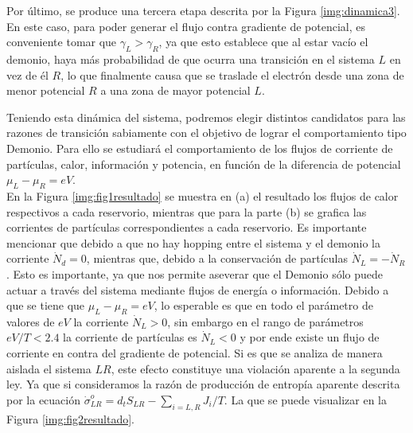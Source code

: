 Por último, se produce una tercera etapa descrita por la Figura \ref{img:dinamica3}. En este caso, para poder generar el flujo contra gradiente de potencial, es conveniente tomar que $\gamma_{L}>\gamma_{R}$, ya que esto establece que al estar vacío el demonio, haya más probabilidad de que ocurra una transición en el sistema $L$ en vez de él $R$, lo que finalmente causa que se traslade el electrón desde una zona de menor potencial $R$ a una zona de mayor potencial $L$.


Teniendo esta dinámica del sistema, podremos elegir distintos candidatos para las razones de transición sabiamente con el objetivo de lograr el comportamiento tipo Demonio. Para ello se estudiará el comportamiento de los flujos de corriente de partículas, calor, información y potencia, en función de la diferencia de potencial $\mu_{L}-\mu_{R}=eV$. \\
En la Figura \ref{img:fig1resultado} se muestra en (a) el resultado los flujos de calor respectivos a cada reservorio, mientras que para la parte (b) se grafica las corrientes de partículas correspondientes a cada reservorio. Es importante mencionar que debido a que no hay hopping entre el sistema y el demonio la corriente $\dot{N}_{d}=0$, mientras que, debido a la conservación de partículas $\dot{N}_{L}=-\dot{N}_{R}$. Esto es importante, ya que nos permite aseverar que el Demonio sólo puede actuar a través del sistema mediante flujos de energía o información. Debido a que se tiene que $\mu_{L}-\mu_{R} = eV$, lo esperable es que en todo el parámetro de valores de $eV$ la corriente $\dot{N}_{L}>0$, sin embargo en el rango de parámetros $eV/T<2.4$ la corriente de partículas es $\dot{N}_{L}<0$ y por ende existe un flujo de corriente en contra del gradiente de potencial. Si es que se analiza de manera aislada el sistema $LR$, este efecto constituye una violación aparente a la segunda ley. Ya que si consideramos la razón de producción de entropía aparente descrita por la ecuación $\dot{\sigma}^{o}_{LR}= d_{t}S_{LR} - \sum_{i=L,R}J_{i}/T$. La que se puede visualizar en la Figura \ref{img:fig2resultado}.


